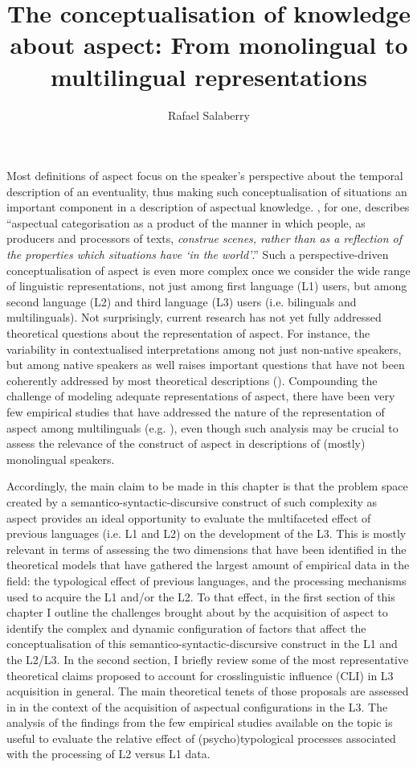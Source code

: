 \documentclass[output=paper,modfonts,nonflat,newtxmath]{langsci/langscibook}
\author{Rafael Salaberry\affiliation{Rice University}}
\title{The conceptualisation of knowledge about aspect: From monolingual to multilingual representations}
\begin{document}
\maketitle

Most definitions of aspect focus on the speaker’s perspective about the temporal description of an eventuality, thus making such conceptualisation of situations an important component in a description of aspectual knowledge. \citet[5, italics added]{Michaelis1998}, for one, describes “aspectual categorisation as a product of the manner in which people, as producers and processors of texts, \textit{construe scenes, rather than as a reflection of the properties which situations have ‘in the world’}.” Such a perspective-driven conceptualisation of aspect is even more complex once we consider the wide range of linguistic representations, not just among first language (L1) users, but among second language (L2) and third language (L3) users (i.e. bilinguals and multilinguals). Not surprisingly, current research has not yet fully addressed theoretical questions about the representation of aspect. For instance, the variability in contextualised interpretations among not just non-native speakers, but among native speakers as well raises important questions that have not been coherently addressed by most theoretical descriptions (\citealt{Salaberry2008, Ziegeler2008, Sasse2012}). Compounding the challenge of modeling adequate representations of aspect, there have been very few empirical studies that have addressed the nature of the representation of aspect among multilinguals (e.g. \citealt{Salaberry2005, Foote2009, DiaubalickGuijarro-Fuentes2016}), even though such analysis may be crucial to assess the relevance of the construct of aspect in descriptions of (mostly) monolingual speakers.

Accordingly, the main claim to be made in this chapter is that the problem space created by a semantico-syntactic-discursive construct of such complexity as aspect provides an ideal opportunity to evaluate the multifaceted effect of previous languages (i.e. L1 and L2) on the development of the L3. This is mostly relevant in terms of assessing the two dimensions that have been identified in the theoretical models that have gathered the largest amount of empirical data in the field: the typological effect of previous languages, and the processing mechanisms used to acquire the L1 and/or the L2. To that effect, in the first section of this chapter I outline the challenges brought about by the acquisition of aspect to identify the complex and dynamic configuration of factors that affect the conceptualisation of this semantico-syntactic-discursive construct in the L1 and the L2/L3. In the second section, I briefly review some of the most representative theoretical claims proposed to account for crosslinguistic influence (CLI) in L3 acquisition in general. The main theoretical tenets of those proposals are assessed in  in the context of the acquisition of aspectual configurations in the L3. The analysis of the findings from the few empirical studies available on the topic is useful to evaluate the relative effect of (psycho)typological processes associated with the processing of L2 versus L1 data.
\end{document}
